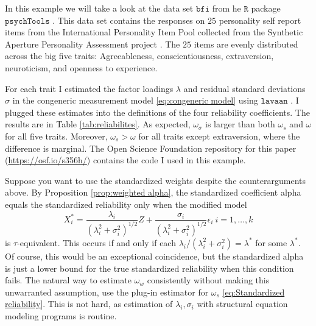 \documentclass[twoside]{article}
\renewcommand{\sqrt}[1]{{(#1)^{1/2}}}
\begin{document}
\begin{example}
\label{exa:reliabilities}


In this example we will take a look at the data set $\texttt{bfi}$ from he $\texttt{R}$ \citep{Team2013-tt} package $\texttt{psychTools}$ \citep{Revelle2019-te}. This data set contains the responses on $25$ personality self report items from the International Personality Item Pool \citep{Goldberg1999-iz} collected from the Synthetic Aperture Personality Assessment project \citep{Revelle2016-ez}. The $25$ items are evenly distributed across the big five traits: Agreeableness, conscientiousness, extraversion, neuroticism, and openness to experience. 

For each trait I estimated the factor loadings $\lambda$ and residual standard deviations $\sigma$ in the congeneric measurement model \eqref{eq:congeneric model} using  $\texttt{lavaan}$ \citep{Rosseel2012-yg}. I plugged these estimates into the definitions of the four reliability coefficients. The results are in Table \ref{tab:reliabilites}. As expected, $\omega_\sigma$ is larger than both $\omega_s$ and $\omega$ for all five traits. Moreover, $\omega_s > \omega$ for all traits except extraversion, where the difference is marginal. The Open Science Foundation repository for this paper (\url{https://osf.io/s356h/}) contains the code I used in this example.
\end{example} 

Suppose you want to use the standardized weights despite the counterarguments above. By Proposition \ref{prop:weighted alpha}, the standardized coefficient alpha equals the standardized reliability only when the modified model
\begin{equation}\label{eq:std-modified model}
X_{i}^{*}=\frac{\lambda_{i}}{\sqrt{\lambda_{i}^{2}+\sigma_{i}^{2}}}Z+\frac{\sigma_{i}}{\sqrt{\lambda_{i}^{2}+\sigma_{i}^{2}}}\epsilon_{i}\:i=1,\ldots,k    \end{equation}
is $\tau$-equivalent. This occurs if and only if each $\lambda_{i}/(\lambda_{i}^{2}+\sigma_{i}^{2})=\lambda^{*}$
for some $\lambda^{*}$. Of course, this would be an exceptional coincidence, but the standardized alpha is just a lower bound for the true standardized reliability when this condition fails. The natural way to estimate $\omega_w$ consistently without making this unwarranted assumption, use the plug-in estimator for $\omega_s$ \eqref{eq:Standardized reliability}. This is not hard, as estimation of $\lambda_{i},\sigma_{i}$ with structural equation modeling programs is routine.
\end{document}
